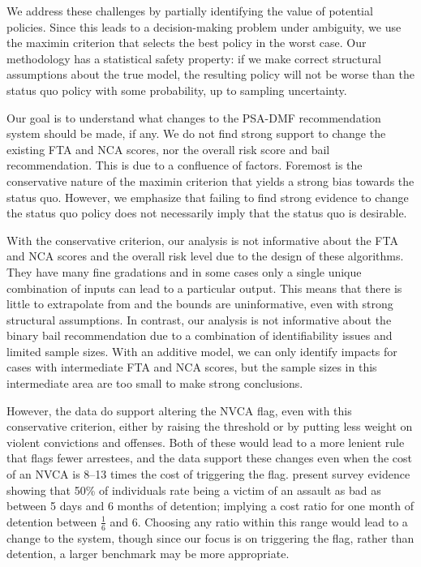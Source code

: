 \documentclass[12pt]{article}
\theoremstyle{definition}
\newcommand{\<}{\langle}
\renewcommand{\>}{\rangle}
\begin{document}
We address these challenges by partially identifying
the value of potential policies.  Since this leads to a
decision-making problem
under ambiguity, we use the maximin criterion that selects the best
policy in the worst case. Our methodology has a statistical safety
property: if we make correct structural assumptions about the true model,
the resulting policy will not be worse than the
status quo policy with some probability, up to sampling uncertainty.


Our goal is to understand what changes to the PSA-DMF
recommendation system should be made, if any. 
We do not find strong
support to change the existing FTA and NCA scores, nor the
overall risk score and bail recommendation.  This is due to a
confluence of factors.  Foremost is the conservative nature of
the maximin criterion that yields a strong bias towards the
status quo. However, we emphasize that
failing to find strong evidence to change the status quo
policy does not necessarily imply that the status quo is
desirable.

With the conservative criterion, our analysis is not informative about
the FTA and NCA scores and the overall risk level due to the design of
these algorithms. They have many fine gradations and in some cases
only a single unique combination of inputs can lead to a particular
output. This means that there is little to extrapolate from and
the bounds are uninformative, even
with strong structural assumptions.
In contrast, our analysis is not informative about the binary bail
recommendation due to a combination of identifiability issues and
limited sample sizes.  With an additive model, we can only identify
impacts for cases with intermediate FTA and NCA scores, but the sample
sizes in this intermediate area are too small to make strong
conclusions.

However, the data do support altering the NVCA flag,
even with this conservative criterion,
either by raising the threshold or by putting
less weight on violent convictions and offenses.
Both of these would lead to a more lenient rule that flags
fewer arrestees, and the data support these changes even when the cost of
an NVCA is 8--13 times the cost of triggering the flag.
\citet{Stevenson2022} present survey evidence showing that 50\% of individuals
rate being a victim of an assault as bad as between 5 days and 6 months of
detention; implying a cost ratio for one month of detention between
$\frac{1}{6}$ and 6.
Choosing any ratio within this range would lead to a change to the system,
though since our focus is on triggering the flag, rather than detention,
a larger benchmark may be more appropriate. 
\end{document}
